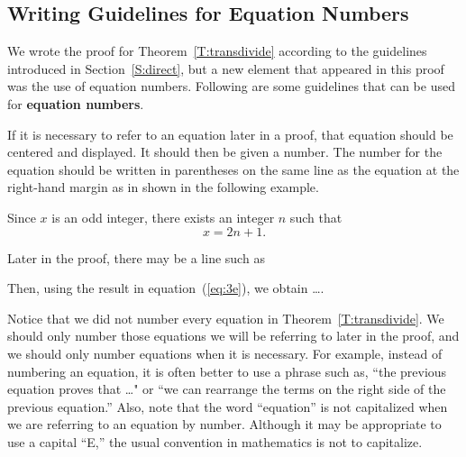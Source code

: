 \subsection*{Writing Guidelines for Equation Numbers}
%

We wrote the proof for Theorem~\ref{T:transdivide} according to the guidelines introduced in Section~\ref{S:direct}, but a new element that appeared in this proof was the use of equation numbers.  Following are some guidelines that can be used for \textbf{equation numbers}.
%

If it is necessary to refer to an equation later in a proof, that equation should be centered and displayed.  It should then be given a number.  The number for the equation should be written in parentheses on the same line as the equation at the right-hand margin as in shown in the following example.

\setcounter{equation}{0}

\eighth
Since  $x$  is an odd integer, there exists an integer  $n$  such that
\begin{equation}\label{eq:3e}
x = 2n + 1.
\end{equation}

\begin{flushleft}
Later in the proof, there may be a line such as
\begin{center}
Then, using the result in equation~(\ref{eq:3e}), we obtain  \ldots .
\end{center}
Notice that we did not number every equation in Theorem~\ref{T:transdivide}.  We should only number those equations we will be referring to later in the proof, and we should only number equations when it is necessary.  For example, instead of numbering an equation, it is often better to use a phrase such as, ``the previous equation proves that \ldots" or ``we can rearrange the terms on the right side of the previous equation.'' 
Also, note that the word ``equation'' is not capitalized when we are referring to an equation by number.  Although it may be appropriate to use a capital ``E,'' the usual convention in mathematics is not to capitalize.
\end{flushleft}
\hbreak

